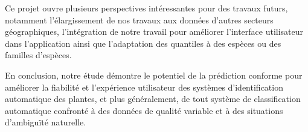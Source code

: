 \documentclass[a4paper,12pt]{article}
\begin{document}
\vspace{0.2cm}

Ce projet ouvre plusieurs perspectives intéressantes pour des travaux futurs, notamment l'élargissement de nos travaux aux données d'autres secteurs géographiques, l'intégration de notre travail pour améliorer l'interface utilisateur dans l'application ainsi que l'adaptation des quantiles à des espèces ou des familles d'espèces.

\vspace{0.2cm}

En conclusion, notre étude démontre le potentiel de la prédiction conforme pour améliorer la fiabilité et l'expérience utilisateur des systèmes d'identification automatique des plantes, et plus généralement, de tout système de classification automatique confronté à des données de qualité variable et à des situations d'ambiguïté naturelle.

\printbibliography
\end{document}

